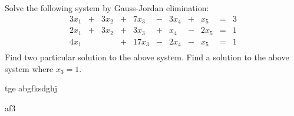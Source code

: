 \begin{Exercise}[name={},
title={}, 
origin={\small by Y. Lamontagne},
counter=Exercise]\Question Solve the following system by Gauss-Jordan elimination:
\[
\begin{array}{ccccccccccccccc}
3x_1 & + & 3x_2 & + & 7x_3 & - & 3x_4 & + & x_5  &  = & 3\\
2x_1 & + & 3x_2 & + & 3x_3 & + & x_4  & - & 2x_5 &  = & 1\\
4x_1 &  &  & +  & 17x_3  & - & 2x_4  & - & x_5  &  = & 1\\
\end{array}
\]
\Question Find two particular solution to the above system.
\Question Find a solution to the above system where $x_3=1$.
\end{Exercise}

\begin{Answer}
\Question
tge abgfksdghj


\Question
af3
\end{Answer}

